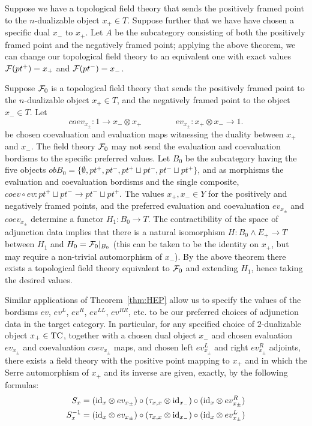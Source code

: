 \documentclass{amsart}
\begin{document}
\begin{appexample}	
	Suppose we have a topological field theory that sends the positively framed point to the $n$-dualizable object $x_+ \in T$. Suppose further that we have have chosen a specific dual $x_-$ to $x_+$. Let $A$ be the subcategory consisting of both the positively framed point and the negatively framed point; applying the above theorem, we can change our topological field theory to an equivalent one with exact values $\mathcal F(pt^+) = x_+$ and $\mathcal F(pt^-) = x_-$.   
\end{appexample}	

\begin{appexample}
	Suppose $\mathcal F_0$ is a topological field theory that sends the positively framed point to the $n$-dualizable object $x_+ \in T$, and the negatively framed point to the object $x_- \in T$.  Let 
\begin{equation*}
	coev_{x_\pm}: 1 \to x_- \otimes x_+ \qquad \qquad ev_{x_\pm}: x_+ \otimes x_- \to 1.
\end{equation*}	
be chosen coevaluation and evaluation maps witnessing the duality between $x_+$ and $x_-$. The field theory $\mathcal F_0$ may not send the evaluation and coevaluation bordisms to the specific preferred values.  Let $B_0$ be the subcategory having the five objects $ob B_0 = \{ \emptyset, pt^+, pt^-, pt^+ \sqcup pt^-, pt^- \sqcup pt^+ \}$, and as morphisms the evaluation and coevaluation bordisms and the single composite, $coev \circ ev: pt^+ \sqcup pt^- \to pt^- \sqcup pt^+$.  The values $x_+, x_- \in Y$ for the positively and negatively framed points, and the preferred evaluation and coevaluation $ev_{x_\pm}$ and $coev_{x_\pm}$ determine a functor $H_1: B_0 \to T$. The contractibility of the space of adjunction data implies that there is a natural isomorphism $H: B_0 \wedge E_+ \to T$ between $H_1$ and $H_0 = \mathcal F_0|_{B_0}$ (this can be taken to be the identity on $x_+$, but may require a non-trivial automorphism of $x_-$). By the above theorem there exists a topological field theory equivalent to $\mathcal F_0$ and extending $H_1$, hence taking the desired values. 
\end{appexample}

Similar applications of Theorem~\ref{thm:HEP} allow us to specify the values of the bordisms $ev$, $ev^L$, $ev^R$, $ev^{LL}$, $ev^{RR}$, etc. to be our preferred choices of adjunction data in the target category.  In particular, for any specified choice of $2$-dualizable object $x_+ \in \mathrm{TC}$, together with a chosen dual object $x_-$ and chosen evaluation $ev_{x_\pm}$ and coevaluation $coev_{x_\pm}$ maps, and chosen left $ev_{x_\pm}^L$ and right $ev_{x_\pm}^R$ adjoints, there exists a field theory with the positive point mapping to $x_+$ and in which the Serre automorphism of $x_+$ and its inverse are given, exactly, by the following formulas:
	\begin{align*}
		S_x &= (\mathrm{id}_{x} \otimes ev_{x_\pm}) \circ (\tau_{x, x} \otimes \mathrm{id}_{x_-}) \circ (\mathrm{id}_{x} \otimes ev_{x_\pm}^R) \\
		S_x^{-1} &= (\mathrm{id}_{x} \otimes ev_{x_\pm}) \circ (\tau_{x, x} \otimes \mathrm{id}_{x_-}) \circ (\mathrm{id}_{x} \otimes ev_{x_\pm}^L)
	\end{align*}
 
\end{document}
